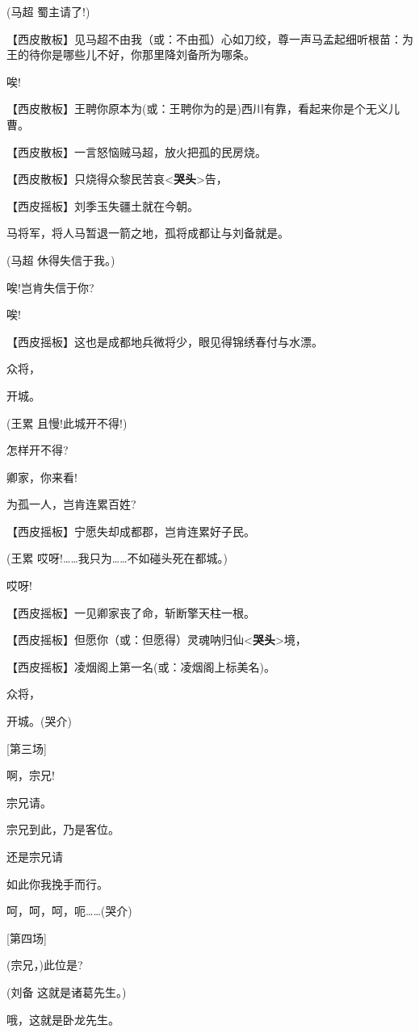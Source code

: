 (马超 蜀主请了!)

【西皮散板】见马超不由我（或：不由孤）心如刀绞，尊一声马孟起细听根苗：为王的待你是哪些儿不好，你那里降刘备所为哪条。

唉!

【西皮散板】王聘你原本为(或：王聘你为的是)西川有靠，看起来你是个无义儿曹。

【西皮散板】一言怒恼贼马超，放火把孤的民房烧。

【西皮散板】只烧得众黎民苦哀\textless{}\textbf{哭头}\textgreater{}告，

【西皮摇板】刘季玉失疆土就在今朝。

马将军，将人马暂退一箭之地，孤将成都让与刘备就是。

(马超 休得失信于我。)

唉!岂肯失信于你?

唉!

【西皮摇板】这也是成都地兵微将少，眼见得锦绣春付与水漂。

众将，

开城。

(王累 且慢!此城开不得!)

怎样开不得?

卿家，你来看!

为孤一人，岂肯连累百姓?

【西皮摇板】宁愿失却成都郡，岂肯连累好子民。

(王累 哎呀!\ldots{}\ldots{}我只为\ldots{}\ldots{}不如碰头死在都城。)

哎呀!

【西皮摇板】一见卿家丧了命，斩断擎天柱一根。

【西皮摇板】但愿你（或：但愿得）灵魂呐归仙\textless{}\textbf{哭头}\textgreater{}境，

【西皮摇板】凌烟阁上第一名(或：凌烟阁上标美名)。

众将，

开城。(哭介)

{[}第三场{]}

啊，宗兄!

宗兄请。

宗兄到此，乃是客位。

还是宗兄请

如此你我挽手而行。

呵，呵，呵，呃\ldots{}\ldots{}(哭介)

{[}第四场{]}

(宗兄，)此位是?

(刘备 这就是诸葛先生。)

哦，这就是卧龙先生。

